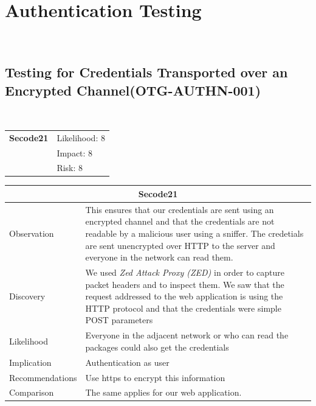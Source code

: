\documentclass[headsepline,footsepline,footinclude=false,oneside,fontsize=11pt,paper=a4,listof=totoc,bibliography=totoc]{scrbook} %
\begin{document}
\section{Authentication Testing}\
\subsection{Testing for Credentials Transported over an Encrypted Channel(OTG-AUTHN-001)}\

\begin{tabular}{cR{12cm}}
	\textbf{Secode21} & Likelihood: 8\\& Impact: 8\\& Risk: 8
\end{tabular}

\begin{tabular}{ l|p{11cm}  }
	\hline
	\multicolumn{2}{c}{\textbf{Secode21}} \\
	\hline
	Observation   & This ensures that our credentials are sent using an encrypted channel
	and that the credentials are not readable by a malicious user using a sniffer. The credetials are sent
	unencrypted over HTTP to the server and everyone in the network can read them.\\
	Discovery  &  We used \textit{Zed Attack Proxy (ZED)} in order to capture packet headers
	and to inspect them.  We saw that the request addressed to the web application is  using the HTTP protocol
	and that the credentials were simple POST parameters\\
	Likelihood & Everyone in the adjacent network or who can read the packages could also get the credentials \\
	Implication    & Authentication as user\\
	Recommendations & Use https to encrypt this information \\
	Comparison & The same applies for our web application.\\
	\hline
\end{tabular}
\\
\vspace{0.5cm}
\\
\end{document}
